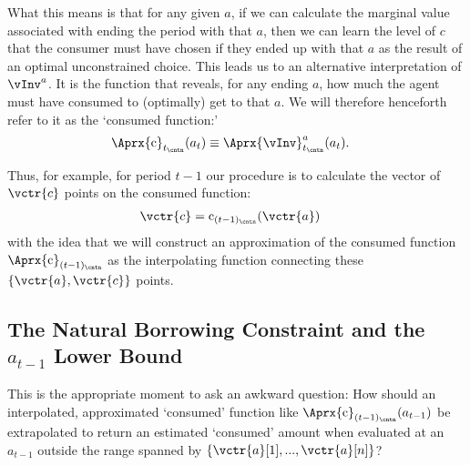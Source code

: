 \documentclass[titlepage, headings=optiontotocandhead]{Resources/texmf-local/tex/latex/econtex}
\begin{document}
What this means is that for any given $a$, if we can calculate the marginal value associated with ending the period with that $a$, then we can learn the level of $c$ that the consumer must have chosen if they ended up with that $a$ as the result of an optimal unconstrained choice.  This leads us to an alternative interpretation of $\vInv^{a}$. It is the function that reveals, for any ending $a$, how much the agent must have consumed to (optimally) get to that $a$.  We will therefore henceforth refer to it as the `consumed function:'
\begin{equation}\begin{gathered}\begin{aligned}
      \Aprx{\mathrm{c}}_{t_\cntn}(a_{t}) & \equiv \Aprx{\vInv}^{a}_{t_\cntn}(a_{t}) \label{eq:consumedfn}.    
    \end{aligned}\end{gathered}\end{equation}

Thus, for example, for period $t-1$ our procedure is to calculate the vector of $\vctr{c}$ points on the consumed function:
\begin{equation}\begin{gathered}\begin{aligned}
      \vctr{c} & = \mathrm{c}_{(t-1)_\cntn}(\vctr{a}) \label{eq:consumedfnvecs}     
    \end{aligned}\end{gathered}\end{equation}
with the idea that we will construct an approximation of the consumed function $\Aprx{\mathrm{c}}_{(t-1)_\cntn}$ as the interpolating function connecting these $\{\vctr{a},\vctr{c}\}$ points.

\hypertarget{the-natural-borrowing-constraint-and-the-a-lower-bound}{}
\subsection{The Natural Borrowing Constraint and the $a_{t-1}$ Lower Bound} \label{subsec:LiqConstrSelfImposed}

This is the appropriate moment to ask an awkward question: How should an interpolated, approximated `consumed' function like $\Aprx{\mathrm{c}}_{(t-1)_\cntn}(a_{t-1})$ be extrapolated to return an estimated `consumed' amount when evaluated at an $a_{t-1}$ outside the range spanned by $\{\vctr{a}[1],...,\vctr{a}[n]\}$?
\end{document}
